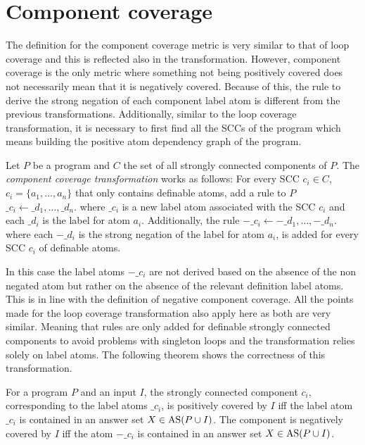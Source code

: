 \section{Component coverage}
\label{sec:Computing coverage metrics for propositional programs/Component coverage}
The definition for the component coverage metric is very similar to that of loop coverage and this is reflected also in the transformation. However, component coverage is the only metric where something not being positively covered does not necessarily mean that it is negatively covered. Because of this, the rule to derive the strong negation of each component label atom is different from the previous transformations. Additionally, similar to the loop coverage transformation, it is necessary to first find all the SCCs of the program which means building the positive atom dependency graph of the program.

\begin{definition}
\label{def:component transformation}
    Let $P$ be a program and $C$ the set of all strongly connected components of $P$. The \emph{component coverage transformation} works as follows: For every SCC \(c_i \in C\), \(c_i = \{a_1, \ldots, a_n\}\) that only contains definable atoms, add a rule to $P$ \(\_c_i \leftarrow \_d_1, \ldots, \_d_n.\) where $\_c_i$ is a new label atom associated with the SCC $c_i$ and each $\_d_i$ is the label for atom $a_i$. Additionally, the rule \(-\_c_i \leftarrow -\_d_1, \ldots, -\_d_n.\) where each $-\_d_i$ is the strong negation of the label for atom $a_i$, is added for every SCC $c_i$ of definable atoms.
\end{definition}

In this case the label atoms $-\_c_i$ are not derived based on the absence of the non negated atom but rather on the absence of the relevant definition label atoms. This is in line with the definition of negative component coverage. All the points made for the loop coverage transformation also apply here as both are very similar. Meaning that rules are only added for definable strongly connected components to avoid problems with singleton loops and the transformation relies solely on label atoms. The following theorem shows the correctness of this transformation. 

\begin{theorem}
\label{th:component transformation}
    For a program $P$ and an input $I$, the strongly connected component $c_i$, corresponding to the label atoms $\_c_i$, is positively covered by $I$ iff the label atom $\_c_i$ is contained in an answer set \(X \in \operatorname{AS}(P \cup I)\). The component is negatively covered by $I$ iff the atom $-\_c_i$ is contained in an answer set \(X \in \operatorname{AS}(P \cup I)\).
\end{theorem}

